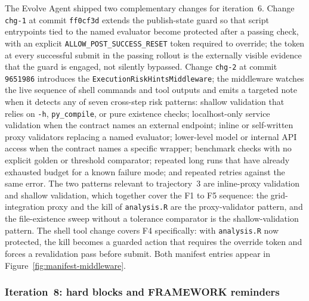 The Evolve Agent shipped two complementary changes for iteration~6. Change \texttt{chg-1} at commit \texttt{ff0cf3d} extends the publish-state guard so that script entrypoints tied to the named evaluator become protected after a passing check, with an explicit \texttt{ALLOW\_POST\_SUCCESS\_RESET} token required to override; the token at every successful submit in the passing rollout is the externally visible evidence that the guard is engaged, not silently bypassed. Change \texttt{chg-2} at commit \texttt{9651986} introduces the \texttt{ExecutionRiskHintsMiddleware}; the middleware watches the live sequence of shell commands and tool outputs and emits a targeted note when it detects any of seven cross-step risk patterns: shallow validation that relies on \texttt{-h}, \texttt{py\_compile}, or pure existence checks; localhost-only service validation when the contract names an external endpoint; inline or self-written proxy validators replacing a named evaluator; lower-level model or internal API access when the contract names a specific wrapper; benchmark checks with no explicit golden or threshold comparator; repeated long runs that have already exhausted budget for a known failure mode; and repeated retries against the same error. The two patterns relevant to trajectory~3 are inline-proxy validation and shallow validation, which together cover the F1 to F5 sequence: the grid-integration proxy and the kill of \texttt{analysis.R} are the proxy-validator pattern, and the file-existence sweep without a tolerance comparator is the shallow-validation pattern. The shell tool change covers F4 specifically: with \texttt{analysis.R} now protected, the kill becomes a guarded action that requires the override token and forces a revalidation pass before submit. Both manifest entries appear in Figure~\ref{fig:manifest-middleware}.


\FloatBarrier

\subsubsection{Iteration~8: hard blocks and FRAMEWORK reminders}
\label{app:case-study:changes:iter8}

